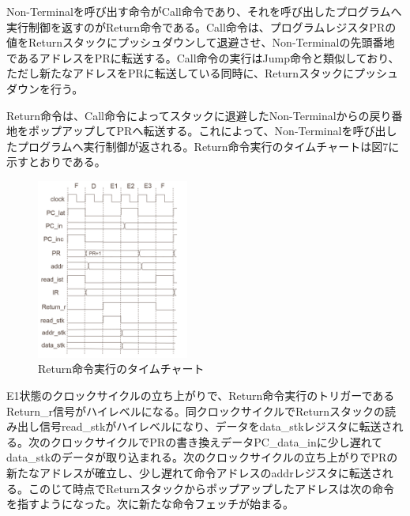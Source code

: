 \documentclass[submit]{ipsj}
\begin{document}
Non-Terminalを呼び出す命令がCall命令であり、それを呼び出したプログラムへ実行制御を返すのがReturn命令である。Call命令は、プログラムレジスタPRの値をReturnスタックにプッシュダウンして退避させ、Non-Terminalの先頭番地であるアドレスをPRに転送する。Call命令の実行はJump命令と類似しており、ただし新たなアドレスをPRに転送している同時に、Returnスタックにプッシュダウンを行う。

Return命令は、Call命令によってスタックに退避したNon-Terminalからの戻り番地をポップアップしてPRへ転送する。これによって、Non-Terminalを呼び出したプログラムへ実行制御が返される。Return命令実行のタイムチャートは図7に示すとおりである。

\begin{figure}[h]
    \begin{center}
        \includegraphics[width=50mm]{./fig/Return}
       \caption{Return命令実行のタイムチャート}
    \end{center}
\end{figure}

E1状態のクロックサイクルの立ち上がりで、Return命令実行のトリガーであるReturn\_r信号がハイレベルになる。同クロックサイクルでReturnスタックの読み出し信号read\_stkがハイレベルになり、データをdata\_stkレジスタに転送される。次のクロックサイクルでPRの書き換えデータPC\_data\_inに少し遅れてdata\_stkのデータが取り込まれる。次のクロックサイクルの立ち上がりでPRの新たなアドレスが確立し、少し遅れて命令アドレスのaddrレジスタに転送される。このじて時点でReturnスタックからポップアップしたアドレスは次の命令を指すようになった。次に新たな命令フェッチが始まる。


\end{document}
